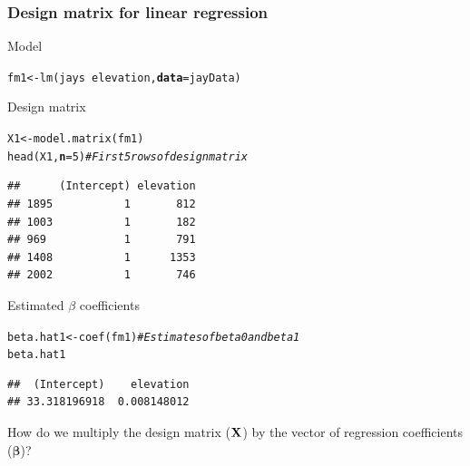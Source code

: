 \documentclass[color=usenames,dvipsnames]{beamer}\usepackage[]{graphicx}\usepackage[]{color}
\makeatletter
\newcommand{\hlnum}[1]{\textcolor[rgb]{0.69,0.494,0}{#1}}%
\newcommand{\hlcom}[1]{\textcolor[rgb]{0.514,0.506,0.514}{\textit{#1}}}%
\newcommand{\hlopt}[1]{\textcolor[rgb]{0,0,0}{#1}}%
\newcommand{\hlstd}[1]{\textcolor[rgb]{0,0,0}{#1}}%
\newcommand{\hlkwb}[1]{\textcolor[rgb]{0,0.341,0.682}{#1}}%
\newcommand{\hlkwc}[1]{\textcolor[rgb]{0,0,0}{\textbf{#1}}}%
\newcommand{\hlkwd}[1]{\textcolor[rgb]{0.004,0.004,0.506}{#1}}%
\newenvironment{kframe}{%
 \def\at@end@of@kframe{}%
 \ifinner\ifhmode%
  \def\at@end@of@kframe{\end{minipage}}%
  \begin{minipage}{\columnwidth}%
 \fi\fi%
 \def\FrameCommand##1{\hskip\@totalleftmargin \hskip-\fboxsep
 \colorbox{shadecolor}{##1}\hskip-\fboxsep
     \hskip-\linewidth \hskip-\@totalleftmargin \hskip\columnwidth}%
 \MakeFramed {\advance\hsize-\width
   \@totalleftmargin\z@ \linewidth\hsize
   \@setminipage}}%
 {\par\unskip\endMakeFramed%
 \at@end@of@kframe}
\newenvironment{knitrout}{}{} %
\makeatother
\begin{document}
\begin{frame}[fragile]
  \frametitle{Design matrix for linear regression}
  \scriptsize %
    {Model}
\begin{knitrout}\scriptsize
{}\color{fgcolor}\begin{kframe}
\begin{alltt}
\hlstd{fm1} \hlkwb{<-} \hlkwd{lm}\hlstd{(jays} \hlopt{~} \hlstd{elevation,} \hlkwc{data}\hlstd{=jayData)}
\end{alltt}
\end{kframe}
\end{knitrout}
    \pause
    \vfill
      {Design matrix}
      \scriptsize %
\begin{knitrout}\scriptsize
{}\color{fgcolor}\begin{kframe}
\begin{alltt}
\hlstd{X1} \hlkwb{<-} \hlkwd{model.matrix}\hlstd{(fm1)}
\hlkwd{head}\hlstd{(X1,} \hlkwc{n}\hlstd{=}\hlnum{5}\hlstd{)} \hlcom{# First 5 rows of design matrix}
\end{alltt}
\begin{verbatim}
##      (Intercept) elevation
## 1895           1       812
## 1003           1       182
## 969            1       791
## 1408           1      1353
## 2002           1       746
\end{verbatim}
\end{kframe}
\end{knitrout}
      {Estimated $\beta$ coefficients}
      \scriptsize %
\begin{knitrout}\scriptsize
{}\color{fgcolor}\begin{kframe}
\begin{alltt}
\hlstd{beta.hat1} \hlkwb{<-} \hlkwd{coef}\hlstd{(fm1)} \hlcom{# Estimates of beta0 and beta1}
\hlstd{beta.hat1}
\end{alltt}
\begin{verbatim}
##  (Intercept)    elevation 
## 33.318196918  0.008148012
\end{verbatim}
\end{kframe}
\end{knitrout}
  \pause
  \vfill
  {\centering How do we multiply the design matrix ($\bf X$) by
    the vector of regression coefficients ($\bm \beta$)? \\}
\end{frame}
\end{document}
